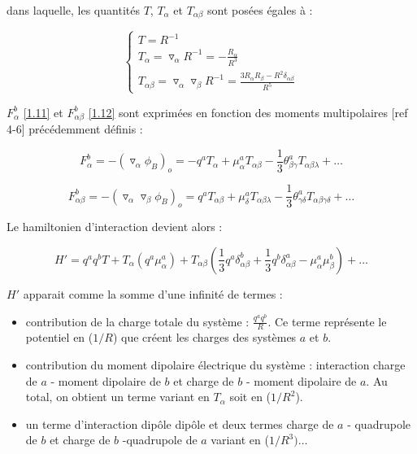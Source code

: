 	dans laquelle, les quantités $T$, $T_{\alpha}$ et $T_{\alpha\beta}$ sont posées égales à :
	
	\begin{equation}
	\begin{cases}
	T = R^{-1} \\
	T_{\alpha} = \triangledown_{\alpha} R^{-1} = - \frac{R_{\alpha}}{R^{3}}\\
	T_{\alpha\beta} = \triangledown_{\alpha} \triangledown_{\beta} R^{-1} = \frac{3R_{\alpha} R_{\beta}- R^{2}\delta_{\alpha\beta}}{R^{5}}
	\end{cases}
	\end{equation}
	
	$F_{\alpha}^{b}$ \ref{1.11} et $F_{\alpha\beta}^{b}$ \ref{1.12} sont exprimées en fonction des moments multipolaires [ref 4-6] précédemment définis : 
	
	\begin{equation}
	F_{\alpha}^{b} = -(\triangledown_{\alpha}\phi_{B})_{o} = -q^{a} T_{\alpha} + \mu_{\alpha}^{a} T_{\alpha\beta} - \frac{1}{3} \theta_{\beta\gamma}^{a} T_{\alpha\beta\lambda} + \ldots 
	\end{equation}
	
	\begin{equation}
	F_{\alpha\beta}^{b} = -(\triangledown_{\alpha} \triangledown_{\beta}\phi_{B})_{o} = q^{a} T_{\alpha\beta} + \mu_{\delta}^{a} T_{\alpha\beta\lambda} - \frac{1}{3} \theta_{\gamma\delta}^{a} T_{\alpha\beta\gamma\delta} + \ldots 
	\end{equation}
	
	Le hamiltonien d'interaction devient alors : 
	
	\begin{equation}
	H' = q^{a} q^{b} T + T_{\alpha}(q^{a} \mu_{\alpha}^{a}) + T_{\alpha\beta} (\frac{1}{3}q^{a}\delta^{b}_{\alpha\beta}+ \frac{1}{3} q^{b}\delta^{a}_{\alpha\beta} - \mu_{\alpha}^{a}\mu_{\beta}^{b}) + \ldots  \label{1.19}
	\end{equation}
	
	$H'$ apparait comme la somme d'une infinité de termes : 
	
	\begin{itemize}
		\item contribution de la charge totale du système : $\frac{q^{a}q^{b}}{R}$. Ce terme représente le potentiel en ($1/R$) que créent les charges des systèmes $a$ et $b$.
		\item contribution du moment dipolaire électrique du système : interaction charge de $a$ - moment dipolaire de $b$ et charge de $b$ - moment dipolaire de $a$. Au total, on obtient un terme variant en $T_{\alpha}$ soit en ($1/R^{2}$).	
		\item un terme d'interaction dipôle dipôle et deux termes charge de $a$ - quadrupole de $b$ et charge de $b$ -quadrupole de $a$ variant en ($1/R^{3}) \ldots$
	\end{itemize}
	

